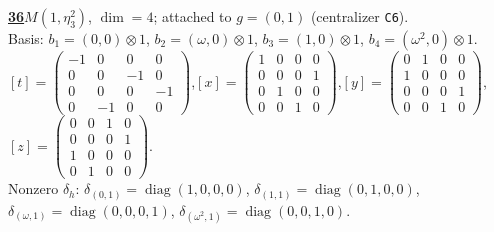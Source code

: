 \begin{samepage}\noindent\textbf{\underline{36}}\quad $M(1,\eta^{2}_{3})$, $\dim=4$; attached to $g=(0,1)$ (centralizer \texttt{C6}).\\
Basis: $b_{1}=(0,0)\otimes 1$, $b_{2}=(\omega,0)\otimes 1$, $b_{3}=(1,0)\otimes 1$, $b_{4}=(\omega^2,0)\otimes 1$.\\
$[t]=\left(\begin{smallmatrix} -1 & 0 & 0 & 0 \\ 0 & 0 & -1 & 0 \\ 0 & 0 & 0 & -1 \\ 0 & -1 & 0 & 0 \end{smallmatrix}\right)$,\quad $[x]=\left(\begin{smallmatrix} 1 & 0 & 0 & 0 \\ 0 & 0 & 0 & 1 \\ 0 & 1 & 0 & 0 \\ 0 & 0 & 1 & 0 \end{smallmatrix}\right)$,\quad $[y]=\left(\begin{smallmatrix} 0 & 1 & 0 & 0 \\ 1 & 0 & 0 & 0 \\ 0 & 0 & 0 & 1 \\ 0 & 0 & 1 & 0 \end{smallmatrix}\right)$,\quad $[z]=\left(\begin{smallmatrix} 0 & 0 & 1 & 0 \\ 0 & 0 & 0 & 1 \\ 1 & 0 & 0 & 0 \\ 0 & 1 & 0 & 0 \end{smallmatrix}\right)$.\\
Nonzero $\delta_h$: $\delta_{(0,1)}=\operatorname{diag}(1,0,0,0)$, $\delta_{(1,1)}=\operatorname{diag}(0,1,0,0)$, $\delta_{(\omega,1)}=\operatorname{diag}(0,0,0,1)$, $\delta_{(\omega^2,1)}=\operatorname{diag}(0,0,1,0)$.\end{samepage}
\medskip

